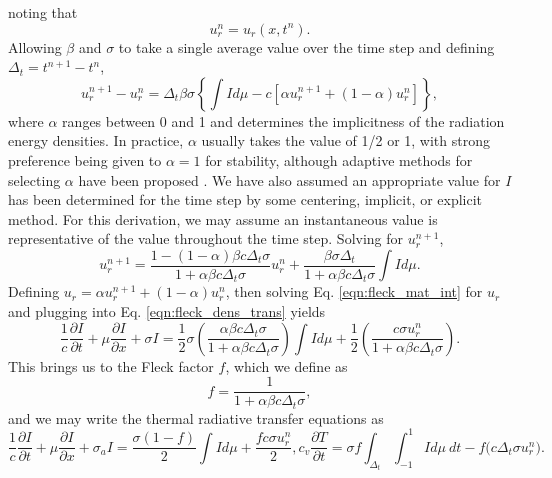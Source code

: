noting that
\[u_r^n=u_r(x,t^n). \]
Allowing $\beta$ and $\sigma$ to take a single average value over the time step and defining $\Delta_t=t^{n+1}-t^n$,
\begin{equation}
u_r^{n+1}-u_r^n=\Delta_t\beta\sigma\left\{ \int Id\mu -c[\alpha u_r^{n+1}+(1-\alpha)u_r^n]\right\},
\end{equation}
where $\alpha$ ranges between 0 and 1 and determines the implicitness of the radiation energy densities.  In practice, $\alpha$ usually takes the value of 1/2 or 1, with strong preference being given to $\alpha=1$ for stability, although adaptive methods for selecting $\alpha$ have been proposed \cite{WolThesis}.  We have also assumed an appropriate value for $I$has been determined for the time step by some centering, implicit, or explicit method.  For this derivation, we may assume an instantaneous value is representative of the value throughout the time step.  Solving for $u_r^{n+1}$,
\begin{equation}\label{eqn:fleck_mat_int}
u_r^{n+1}=\frac{1-(1-\alpha)\beta c\Delta_t\sigma}{1+\alpha\beta c\Delta_t\sigma}u_r^n +\frac{\beta\sigma\Delta_t}{1+\alpha\beta c\Delta_t\sigma}\int Id\mu.
\end{equation}
Defining $u_r=\alpha u_r^{n+1}+(1-\alpha)u_r^n$, then solving Eq. \ref{eqn:fleck_mat_int} for $u_r$ and plugging into Eq. \ref{eqn:fleck_dens_trans} yields
\begin{equation}
\frac{1}{c}\frac{\partial I}{\partial t}+\mu\frac{\partial I}{\partial x}+\sigma I =
  \frac{1}{2}\sigma\left(\frac{\alpha\beta c\Delta_t\sigma}{1+\alpha\beta c\Delta_t\sigma}\right)\int Id\mu + \frac{1}{2}\left(\frac{c\sigma u_r^n}{1+\alpha\beta c\Delta_t\sigma}\right).
\end{equation} 
This brings us to the Fleck factor $f$, which we define as
\begin{equation}
f=\frac{1}{1+\alpha\beta c\Delta_t\sigma},
\end{equation}
and we may write the thermal radiative transfer equations as
\begin{subequations}
\begin{equation}
\frac{1}{c}\frac{\partial I}{\partial t}+\mu\frac{\partial I}{\partial x}+\sigma_a I = 
    \frac{\sigma(1-f)}{2}\int Id\mu+\frac{fc\sigma u_r^n}{2},
\end{equation}
\begin{equation}
c_v\frac{\partial T}{\partial t}=\sigma f\int_{\Delta_t}\int_{-1}^1 Id\mu\ dt-f\big(c\Delta_t\sigma u_r^n\big).
\end{equation}
\end{subequations}
